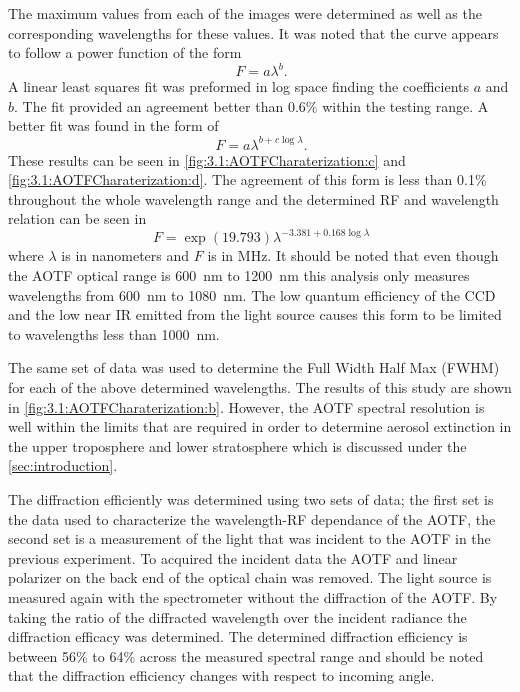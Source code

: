 \documentclass[12pt]{article}
\begin{document}
The maximum values from each of the images were determined as well as the corresponding wavelengths for these values. It was noted that the curve appears to follow a power function of the form
\begin{equation}
    \ F = a\lambda^{b}.
    \label{eqn:3.1:powerFunction}
\end{equation}
A linear least squares fit was preformed in log space finding the coefficients $a$ and $b$. The fit provided an agreement better than 0.6\% within the testing range. A better fit was found in the form of
 \begin{equation}
    \ F = a\lambda^{b+c\log\lambda}.
    \label{eqn:3.1:modifiedPowerFunction}
\end{equation}
These results can be seen in \autoref{fig:3.1:AOTFCharaterization:c} and \autoref{fig:3.1:AOTFCharaterization:d}. The agreement of this form is less than 0.1\% throughout the whole wavelength range and the determined RF and wavelength relation can be seen in
\begin{equation}
    \ F = \exp{(19.793)}\lambda^{-3.381+0.168\log\lambda}
    \label{eqn:3.1:modifiedPowerFunctionCoeffiecicents}
\end{equation}
where $\lambda$ is in nanometers and $F$ is in MHz. It should be noted that even though the AOTF optical range is 600~nm to 1200~nm this analysis only measures wavelengths from 600~nm to 1080~nm. The low quantum efficiency of the CCD and the low near IR emitted from the light source causes this form to be limited to wavelengths less than 1000~nm.

The same set of data was used to determine the Full Width Half Max (FWHM) for each of the above determined wavelengths. The results of this study are shown in \autoref{fig:3.1:AOTFCharaterization:b}. However, the AOTF spectral resolution is well within the limits that are required in order to determine aerosol extinction in the upper troposphere and lower stratosphere which is discussed under the \autoref{sec:introduction}.

The diffraction efficiently was determined using two sets of data; the first set is the data used to characterize the wavelength-RF dependance of the AOTF, the second set is a measurement of the light that was incident to the AOTF in the previous experiment. To acquired the incident data the AOTF and linear polarizer on the back end of the optical chain was removed. The light source is measured again with the spectrometer without the diffraction of the AOTF. By taking the ratio of the diffracted wavelength over the incident radiance the diffraction efficacy was determined. The determined diffraction efficiency is between 56\% to 64\% across the measured spectral range and should be noted that the diffraction efficiency changes with respect to incoming angle.
\end{document}
